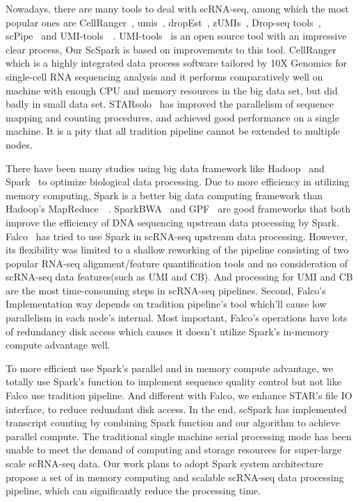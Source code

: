 \documentclass[runningheads]{llncs}
\begin{document}
Nowadays, there are many tools to deal with scRNA-seq, among which the most popular ones are CellRanger~\cite{zheng2017Massively}, umis~\cite{Svensson2017PowerAO}, dropEst~\cite{Petukhov2018dropEstPF}, zUMIs~\cite{swati0zUMIs}, Drop-seq tools~\cite{Macosko2015HighlyPG}, scPipe~\cite{tian2018scPipe} and UMI-tools~\cite{Smith2017UMItoolsMS}~\cite{gao2020Comparison}. 
UMI-tools~\cite{ref_url1} is an open source tool with an impressive clear process, Our ScSpark is based on improvements to this tool.
CellRanger which is a highly integrated data process software tailored by 10X Genomics for single-cell RNA sequencing analysis and it performs comparatively well on machine with enough CPU and memory resources in the big data set, but did badly in small data set.
STARsolo~\cite{2019STARsolo} has improved the parallelism of sequence mapping and counting procedures, and achieved good performance on a single machine.
It is a pity that all tradition pipeline cannot be extended to multiple nodes.

There have been many studies using big data framework like 
                                                           Hadoop~\cite{ref_url2}
                                                                                  and Spark~\cite{ref_url3} to optimize biological data processing.
Due to more efficiency in utilizing memory computing, Spark is a better big data computing framework than Hadoop's MapReduce~\cite{dean2008mapreduce}~\cite{zaharia2012resilient}.
SparkBWA~\cite{abuin2016sparkbwa} and GPF~\cite{li2018high} are good frameworks that both improve the efficiency of DNA sequencing upstream data processing by Spark.
Falco~\cite{Yang2016Falco} has tried to use Spark in scRNA-seq upstream data processing.
However, its flexibility was limited to a shallow reworking of the pipeline consisting of two popular RNA-seq alignment/feature quantification tools and no consideration of scRNA-seq data features(such as UMI and CB).
And processing for UMI and CB are the most time-consuming steps in scRNA-seq pipelines.
Second, Falco's Implementation way depends on tradition pipeline's tool which'll cause low parallelism in each node's internal.
Most important, Falco’s operations have lots of redundancy disk access which causes it doesn't utilize Spark’s in-memory compute advantage well.

To more efficient use Spark's parallel and in memory compute advantage, we totally use Spark's function to implement sequence quality control but not like Falco use tradition pipeline.
And different with Falco, we enhance STAR's file IO interface, to reduce redundant disk access.
In the end, scSpark has implemented transcript counting by combining Spark function and our algorithm to achieve parallel compute.
The traditional single machine serial processing mode has been unable to meet the demand of computing and storage resources for super-large scale scRNA-seq data.
Our work plans to adopt Spark system architecture propose a set of in memory computing and scalable scRNA-seq data processing pipeline, which can significantly reduce the processing time.
\end{document}

